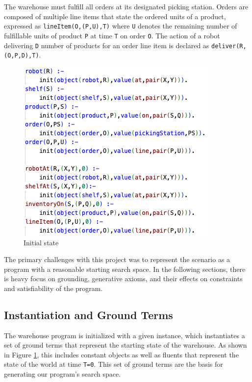\documentclass[letterpaper]{article}
\newcommand{\ct}[1]{\texttt{#1}}
\begin{document}
The warehouse must fulfill all orders at its designated picking station. Orders are composed of multiple line items that state the ordered units of a product, expressed as \ct{lineItem(O,(P,U),T)} where \ct{U} denotes the remaining number of fulfillable units of product \ct{P} at time \ct{T} on order \ct{O}. The action of a robot delivering \ct{D} number of products for an order line item is declared as \ct{deliver(R,(O,P,D),T)}.

\begin{figure}[t]
\centering
\includegraphics[width=0.9\columnwidth]{init.png}
\caption{Initial state}
\label{fig1:image}
\end{figure}

The primary challenges with this project was to represent the scenario as a program with a reasonable starting search space. In the following sections, there is heavy focus on grounding, generative axioms, and their effects on constraints and satisfiability of the program.

\subsection{Instantiation and Ground Terms}

The warehouse program is initialized with a given instance, which instantiates a set of ground terms that represent the starting state of the warehouse. As shown in Figure \ref{fig1:image}, this includes constant objects as well as fluents that represent the state of the world at time \ct{T=0}. This set of ground terms are the basis for generating our program's search space.
\end{document}
